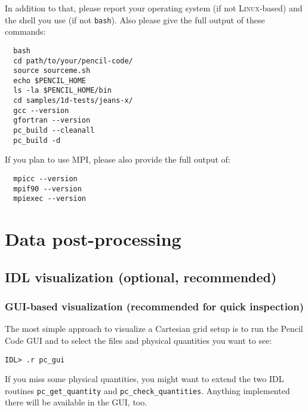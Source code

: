 \documentclass[a4paper,12pt]{article}
\newcommand{\command}[1]{\texttt{#1}}
\newcommand{\name}[1]{\textsc{#1}}
\begin{document}
In addition to that, please report your operating system (if not \name{Linux}-based) and the shell you use (if not \command{bash}).
Also please give the full output of these commands:
\begin{verbatim}
  bash
  cd path/to/your/pencil-code/
  source sourceme.sh
  echo $PENCIL_HOME
  ls -la $PENCIL_HOME/bin
  cd samples/1d-tests/jeans-x/
  gcc --version
  gfortran --version
  pc_build --cleanall
  pc_build -d
\end{verbatim}

If you plan to use \name{MPI}, please also provide the full output of:
\begin{verbatim}
  mpicc --version
  mpif90 --version
  mpiexec --version
\end{verbatim}

\section{Data post-processing}

\subsection{IDL visualization (optional, recommended)}

\subsubsection{GUI-based visualization (recommended for quick inspection)}
The most simple approach to visualize a Cartesian grid setup is to run the Pencil Code GUI and to select the files and physical quantities you want to see:
\begin{verbatim}
IDL> .r pc_gui
\end{verbatim}
If you miss some physical quantities, you might want to extend the two IDL routines \command{pc\_get\_quantity} and \command{pc\_check\_quantities}. Anything implemented there will be available in the GUI, too.
\end{document}

